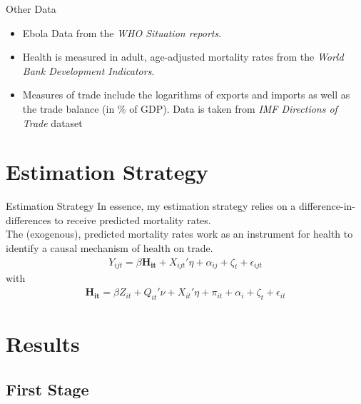 \documentclass[11pt]{beamer}
\begin{document}
\begin{frame}{Other Data}
\begin{itemize}
\item Ebola Data from the \textit{WHO Situation reports}.

\item Health is measured in adult, age-adjusted mortality rates from the \textit{World Bank Development Indicators}.

\item Measures of trade include the logarithms of exports and imports as well as the trade balance (in \% of GDP). Data is taken from \textit{IMF Directions of Trade} dataset

\end{itemize}

\end{frame}


\section{Estimation Strategy}

\begin{frame}{Estimation Strategy}
In essence, my estimation strategy relies on a difference-in-differences to receive predicted mortality rates. \\
The (exogenous), predicted mortality rates work as an instrument for health to identify a causal mechanism of health on trade. \\
\begin{align}
Y_{ijt} =  \beta \mathbf{H_{it}} +  X_{ijt}'\eta + \alpha_{ij} + \zeta_t + \epsilon_{ijt}
\end{align}
with 
\begin{align}
\mathbf{H_{it}} =  \beta Z_{it} +  Q_{it}'\nu + X_{it}'\eta + \pi_{it} + \alpha_i + \zeta_t + \epsilon_{it}
\end{align}


\end{frame}

\section{Results}

\subsection{First Stage}
\end{document}
